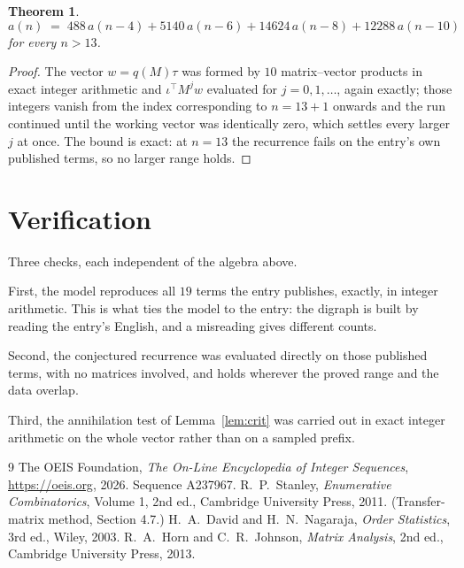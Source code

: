 \documentclass[11pt,a4paper]{article}
\theoremstyle{plain}
\newtheorem{theorem}{Theorem}
\theoremstyle{definition}
\begin{document}
\begin{theorem}
\[
a(n)\;=\;488\,a(n-4) + 5140\,a(n-6) + 14624\,a(n-8) + 12288\,a(n-10)
\]
for every $n>13$.
\end{theorem}

\begin{proof}
The vector $w=q(M)\tau$ was formed by $10$ matrix--vector products in exact integer
arithmetic and $\iota^{\!\top}M^{j}w$ evaluated for $j=0,1,\dots$, again exactly; those
integers vanish from the index corresponding to $n=13+1$ onwards and the run continued
until the working vector was identically zero, which settles every larger $j$ at once. The bound is exact: at $n=13$ the recurrence fails on the entry's own published terms, so no larger range holds.
\end{proof}

\section{Verification}

Three checks, each independent of the algebra above.

First, the model reproduces all $19$ terms the entry publishes, exactly, in integer
arithmetic. This is what ties the model to the entry: the digraph is built by reading the
entry's English, and a misreading gives different counts.

Second, the conjectured recurrence was evaluated directly on those published terms, with no
matrices involved, and holds wherever the proved range and the data overlap.

Third, the annihilation test of Lemma~\ref{lem:crit} was carried out in exact integer
arithmetic on the whole vector rather than on a sampled prefix.

\begin{thebibliography}{9}
 The OEIS Foundation, \emph{The On-Line Encyclopedia of Integer
Sequences}, \url{https://oeis.org}, 2026. Sequence A237967.
 R.~P.~Stanley, \emph{Enumerative Combinatorics}, Volume 1, 2nd ed.,
Cambridge University Press, 2011. (Transfer-matrix method, Section 4.7.)
 H.~A.~David and H.~N.~Nagaraja, \emph{Order Statistics}, 3rd ed., Wiley,
2003.
 R.~A.~Horn and C.~R.~Johnson, \emph{Matrix Analysis}, 2nd ed., Cambridge
University Press, 2013.
\end{thebibliography}
\end{document}

